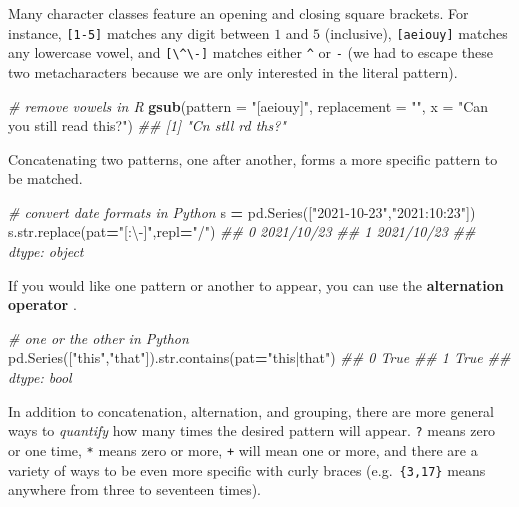 \documentclass[12pt,krantz2]{krantz}
\makeatletter
\newenvironment{Shaded}{\begin{snugshade}}{\end{snugshade}}
\newcommand{\BuiltInTok}[1]{#1}
\newcommand{\CommentTok}[1]{\textcolor[rgb]{0.37,0.37,0.37}{\textit{#1}}}
\newcommand{\DataTypeTok}[1]{\textcolor[rgb]{0.27,0.27,0.27}{#1}}
\newcommand{\KeywordTok}[1]{\textcolor[rgb]{0.27,0.27,0.27}{\textbf{#1}}}
\newcommand{\NormalTok}[1]{#1}
\newcommand{\OperatorTok}[1]{\textcolor[rgb]{0.43,0.43,0.43}{\textbf{#1}}}
\newcommand{\StringTok}[1]{\textcolor[rgb]{0.5,0.5,0.5}{#1}}
\newenvironment{kframe}{%
\medskip{}
\setlength{\fboxsep}{.8em}
 \def\at@end@of@kframe{}%
 \ifinner\ifhmode%
  \def\at@end@of@kframe{\end{minipage}}%
  \begin{minipage}{\columnwidth}%
 \fi\fi%
 \def\FrameCommand##1{\hskip\@totalleftmargin \hskip-\fboxsep
 \colorbox{shadecolor}{##1}\hskip-\fboxsep
     \hskip-\linewidth \hskip-\@totalleftmargin \hskip\columnwidth}%
 \MakeFramed {\advance\hsize-\width
   \@totalleftmargin\z@ \linewidth\hsize
   \@setminipage}}%
 {\par\unskip\endMakeFramed%
 \at@end@of@kframe}
\renewenvironment{Shaded}{\begin{kframe}}{\end{kframe}}
\makeatother
\begin{document}
Many character classes feature an opening and closing square brackets. For instance, \texttt{{[}1-5{]}} matches any digit between \(1\) and \(5\) (inclusive), \texttt{{[}aeiouy{]}} matches any lowercase vowel, and \texttt{{[}\textbackslash{}\^{}\textbackslash{}-{]}} matches either \texttt{\^{}} or \texttt{-} (we had to escape these two metacharacters because we are only interested in the literal pattern).

\begin{Shaded}
\begin{Highlighting}[]
\CommentTok{# remove vowels in R}
\KeywordTok{gsub}\NormalTok{(}\DataTypeTok{pattern =} \StringTok{"[aeiouy]"}\NormalTok{, }\DataTypeTok{replacement =} \StringTok{""}\NormalTok{, }
     \DataTypeTok{x =} \StringTok{"Can you still read this?"}\NormalTok{)}
\CommentTok{## [1] "Cn  stll rd ths?"}
\end{Highlighting}
\end{Shaded}

Concatenating two patterns, one after another, forms a more specific pattern to be matched.

\begin{Shaded}
\begin{Highlighting}[]
\CommentTok{# convert date formats in Python}
\NormalTok{s }\OperatorTok{=}\NormalTok{ pd.Series([}\StringTok{"2021-10-23"}\NormalTok{,}\StringTok{"2021:10:23"}\NormalTok{])}
\NormalTok{s.}\BuiltInTok{str}\NormalTok{.replace(pat}\OperatorTok{=}\StringTok{"[:\textbackslash{}-]"}\NormalTok{,repl}\OperatorTok{=}\StringTok{"/"}\NormalTok{)}
\CommentTok{## 0    2021/10/23}
\CommentTok{## 1    2021/10/23}
\CommentTok{## dtype: object}
\end{Highlighting}
\end{Shaded}

If you would like one pattern or another to appear, you can use the \textbf{alternation operator} \texttt{\textbar{}}.

\begin{Shaded}
\begin{Highlighting}[]
\CommentTok{# one or the other in Python}
\NormalTok{pd.Series([}\StringTok{"this"}\NormalTok{,}\StringTok{"that"}\NormalTok{]).}\BuiltInTok{str}\NormalTok{.contains(pat}\OperatorTok{=}\StringTok{"this|that"}\NormalTok{)}
\CommentTok{## 0    True}
\CommentTok{## 1    True}
\CommentTok{## dtype: bool}
\end{Highlighting}
\end{Shaded}

In addition to concatenation, alternation, and grouping, there are more general ways to \emph{quantify} how many times the desired pattern will appear. \texttt{?} means zero or one time, \texttt{*} means zero or more, \texttt{+} will mean one or more, and there are a variety of ways to be even more specific with curly braces (e.g.~\texttt{\{3,17\}} means anywhere from three to seventeen times).
\end{document}

